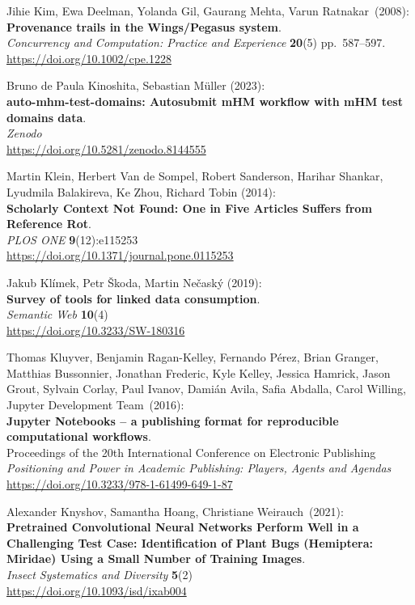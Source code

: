 \begin{thebibliography}{9}
Jihie Kim, Ewa Deelman, Yolanda Gil, Gaurang Mehta, Varun
Ratnakar~(2008):\\
\textbf{Provenance trails in the Wings/Pegasus system}.\\
\emph{Concurrency and Computation: Practice and Experience}
\textbf{20}(5) pp.~587--597.\\
\url{https://doi.org/10.1002/cpe.1228}

Bruno de Paula Kinoshita, Sebastian Müller (2023):\\
\textbf{auto-mhm-test-domains: Autosubmit mHM workflow with mHM test domains data}.\\
\emph{Zenodo}\\
\url{https://doi.org/10.5281/zenodo.8144555}

Martin Klein, Herbert Van de Sompel, Robert Sanderson, Harihar Shankar,
Lyudmila Balakireva, Ke Zhou, Richard Tobin (2014): \\
\textbf{Scholarly Context Not Found: One in Five Articles Suffers from Reference Rot}.\\
\emph{PLOS ONE} \textbf{9}(12):e115253\\
\url{https://doi.org/10.1371/journal.pone.0115253}

Jakub Klímek, Petr Škoda, Martin Nečaský (2019): \\
\textbf{Survey of tools for linked data consumption}. \\
\emph{Semantic Web} \textbf{10}(4) \\
\url{https://doi.org/10.3233/SW-180316}

Thomas Kluyver, Benjamin Ragan-Kelley, Fernando Pérez, Brian Granger, Matthias Bussonnier, Jonathan Frederic, Kyle Kelley, Jessica Hamrick, Jason Grout, Sylvain Corlay, Paul Ivanov, Damián Avila, Safia Abdalla, Carol Willing, Jupyter Development Team~(2016):\\
\textbf{Jupyter Notebooks – a publishing format for reproducible computational workflows}.\\
Proceedings of the 20th International Conference on Electronic Publishing\\
\emph{Positioning and Power in Academic Publishing: Players, Agents and Agendas}\\ 
\url{https://doi.org/10.3233/978-1-61499-649-1-87}

Alexander Knyshov, Samantha Hoang, Christiane Weirauch~(2021):\\
\textbf{Pretrained Convolutional Neural Networks Perform Well in a Challenging Test Case:
Identification of Plant Bugs (Hemiptera: Miridae) Using a Small Number
of Training Images}. \\
\emph{Insect Systematics and Diversity} \textbf{5}(2)\\
\url{https://doi.org/10.1093/isd/ixab004}


\end{thebibliography}
